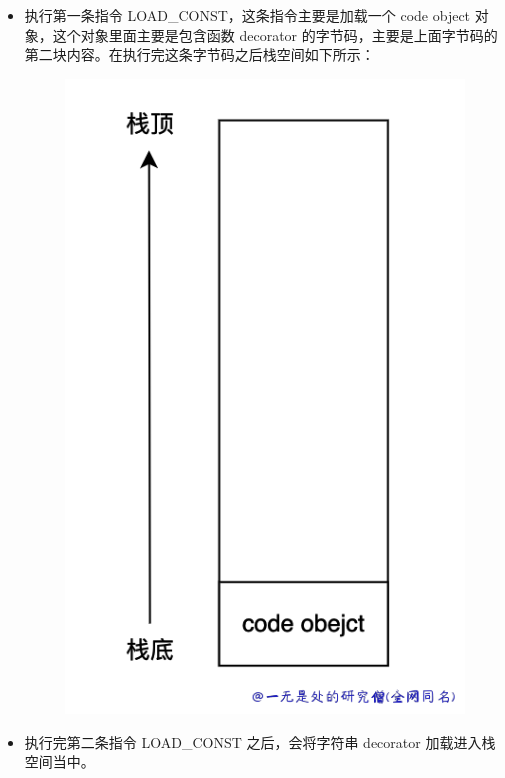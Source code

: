 \begin{itemize}
\item 执行第一条指令 LOAD\_CONST，这条指令主要是加载一个 code object 对象，这个对象里面主要是包含函数 decorator 的字节码，主要是上面字节码的第二块内容。在执行完这条字节码之后栈空间如下所示： 

    \begin{figure}[H]
        \centering
            \includegraphics[scale=.25]{images/47-bytecode.png}
						\caption{ }
        \label{fig:my_label}
    \end{figure}
    
\item 执行完第二条指令 LOAD\_CONST 之后，会将字符串 decorator 加载进入栈空间当中。 


\end{itemize}
